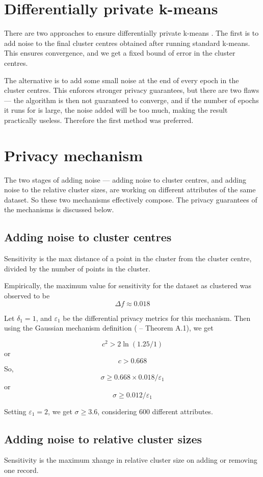 \documentclass[]{article}
\begin{document}
\section{Differentially private k-means}

There are two approaches to ensure differentially private k-means \cite{smoothsenst}. The first is to add noise to the final cluster centres obtained after running standard k-means. This ensures convergence, and we get a fixed bound of error in the cluster centres. 

The alternative is to add some small noise at the end of every epoch in the cluster centres. This enforces stronger privacy guarantees, but there are two flaws --- the algorithm is then not guaranteed to converge, and if the number of epochs it runs for is large, the noise added will be too much, making the result practically useless. Therefore the first method was preferred.


\section{Privacy mechanism}
The two stages of adding noise --- adding noise to cluster centres, and adding noise to the relative cluster sizes, are working on different attributes of the same dataset. So these two mechanisms effectively compose. The privacy guarantees of the mechanisms is discussed below.

\subsection{Adding noise to cluster centres}
Sensitivity is the max distance of a point in the cluster from the cluster centre, divided by the number of points in the cluster.

Empirically, the maximum value for sensitivity for the dataset as clustered was observed to be 
\[\Delta f \approx 0.018\]

Let $\delta_1 = 1$, and $\varepsilon_1$ be the differential privacy metrics for this mechanism. Then using the Gaussian mechanism definition (\cite{diffp} -- Theorem A.1), we get

\[c^2 > 2\ln(1.25/1)\]
or \[c > 0.668\]
So, \[\sigma \geq 0.668\times 0.018/\varepsilon_1\]
or \[\sigma \geq 0.012/\varepsilon_{1}\]

Setting $\varepsilon_1 = 2$, we get $\sigma \geq 3.6$, considering 600 different attributes.

\subsection{Adding noise to relative cluster sizes}
Sensitivity is the maximum xhange in relative cluster size on adding or removing one record.
\end{document}
